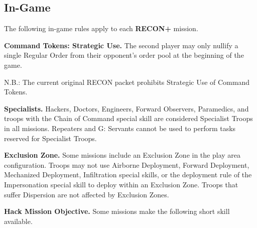 \documentclass[14pt,dvipsnames]{extarticle}
\newcommand{\missionrule}[1]{\noindent\textbf{#1}\xspace}
\newcommand{\reconplus}{\textbf{RECON+}\xspace}
\begin{document}
\subsection{In-Game}

The following in-game rules apply to each \reconplus mission.

\missionrule{Command Tokens: Strategic Use.}  The second player may
only nullify a single Regular Order from their opponent's order pool
at the beginning of the game.


\begin{recon}
  N.B.: The current original RECON packet prohibits
  Strategic Use of Command Tokens.
\end{recon}

\missionrule{Specialists.}  Hackers, Doctors, Engineers, Forward
Observers, Paramedics, and troops with the Chain of Command special
skill are considered Specialist Troops in all missions.  Repeaters and
G: Servants cannot be used to perform tasks reserved for Specialist
Troops.

\missionrule{Exclusion Zone.}  Some missions include an Exclusion Zone
in the play area configuration.  Troops may not use Airborne
Deployment, Forward Deployment, Mechanized Deployment, Infiltration
special skills, or the deployment rule of the Impersonation special
skill to deploy within an Exclusion Zone.  Troops that suffer
Dispersion are not affected by Exclusion Zones.

\missionrule{Hack Mission Objective.} Some missions make the following
short skill available.
\end{document}
